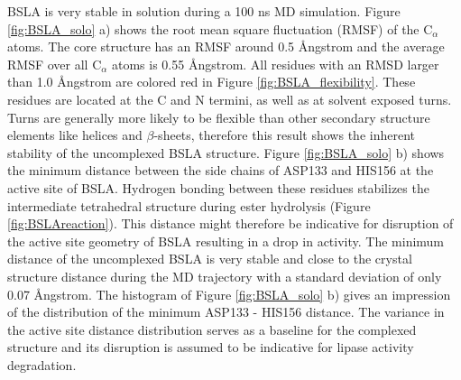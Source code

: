 \documentclass[english, a4paper, 12pt, titlepage, draft]{article}
\begin{document}
BSLA is very stable in solution during a 100 ns MD simulation.
Figure \ref{fig:BSLA_solo} a) shows the root mean square fluctuation (RMSF) of the C$_{\alpha}$ atoms.
The core structure has an RMSF around 0.5 \r{A}ngstrom and the average RMSF over all C$_{\alpha}$ atoms is 0.55 \r{A}ngstrom.
All residues with an RMSD larger than 1.0 \r{A}ngstrom are colored red in Figure \ref{fig:BSLA_flexibility}.
These residues are located at the C and N termini, as well as at solvent exposed turns.
Turns are generally more likely to be flexible than other secondary structure elements like helices and $\beta$-sheets, therefore this result shows the inherent stability of the uncomplexed BSLA structure.
Figure \ref{fig:BSLA_solo} b) shows the minimum distance between the side chains of ASP133 and HIS156 at the active site of BSLA.
Hydrogen bonding between these residues stabilizes the intermediate tetrahedral structure during ester hydrolysis (Figure \ref{fig:BSLAreaction}).
This distance might therefore be indicative for disruption of the active site geometry of BSLA resulting in a drop in activity.
The minimum distance of the uncomplexed BSLA is very stable and close to the crystal structure distance during the MD trajectory with a standard deviation of only 0.07 \r{A}ngstrom.
The histogram of Figure \ref{fig:BSLA_solo} b) gives an impression of the distribution of the minimum ASP133 - HIS156 distance.
The variance in the active site distance distribution serves as a baseline for the complexed structure and its disruption is assumed to be indicative for lipase activity degradation.
\end{document}
